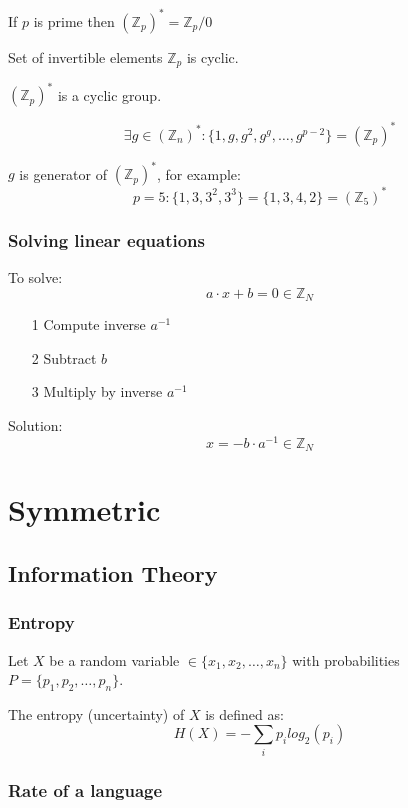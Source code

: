 \documentclass[a4paper]{article}
\begin{document}
If $p$ is prime then $(\mathbb{Z}_{p})^{*} = \mathbb{Z}_{p} / {0}$

Set of invertible elements $\mathbb{Z}_{p}$ is cyclic.

$(\mathbb{Z}_{p})^{*}$ is a cyclic group.

\[
  \exists g \in (\mathbb{Z}_{n})^{*} :
  \{1, g, g^{2}, g^{g}, \ldots, g^{p-2}\} = (\mathbb{Z}_{p})^{*}
\]

$g$ is  generator of $(\mathbb{Z}_{p})^{*}$, for example:
\[p = 5: \{1, 3, 3^{2}, 3^{3}\} = \{1, 3, 4, 2\} = (\mathbb{Z}_{5})^{*}\]

\subsubsection{Solving linear equations}

To solve:
\[a \cdot x + b = 0 \in \mathbb{Z}_{N}\]

\begin{enumerate}
  \item[1] Compute inverse $a^{-1}$
  \item[2] Subtract $b$
  \item[3] Multiply by inverse $a^{-1}$
\end{enumerate}

Solution:
\[x = -b \cdot a^{-1} \in \mathbb{Z}_{N}\]

\section{Symmetric}

\subsection{Information Theory}

\subsubsection{Entropy}

Let $X$ be a random variable $\in \{x_{1}, x_{2}, \ldots,x_{n}\}$ with
probabilities $P = \{p_{1}, p_{2}, \ldots, p_{n}\}$.

The entropy (uncertainty) of $X$ is defined as:
\[
  H(X) = -\sum_{i} p_{i} log_{2}(p_{i})
\]

\subsubsection{Rate of a language}
\end{document}

